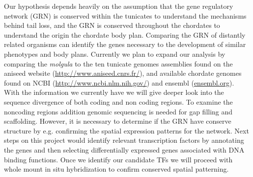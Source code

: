 Our hypothesis depends heavily on the assumption that the gene regulatory network (GRN) is conserved within the tunicates to understand the mechanisms behind tail loss, and the GRN is conserved throughout the chordates to understand the origin the chordate body plan. Comparing the GRN of distantly related organisms can identify the genes necessary to the development of similar phenotypes and body plans. Currently we plan to expand our analysis by comparing the \textit{molgula} to the ten tunicate genomes assemblies found on the aniseed website (\url{http://www.aniseed.cnrs.fr/}), and available chordate genomes found on NCBI (\url{http://www.ncbi.nlm.nih.gov/}) and ensembl (\url{ensembl.org}). With the information we currently have we will give deeper look into the sequence divergence of both coding and non coding regions. To examine the noncoding regions addition genomic sequencing is needed for gap filling and scaffolding. However, it is necessary to determine if the GRN have conserve structure by e.g. confirming the spatial expression patterns for the network. Next steps on this project would identify relevant transcription factors by annotating the genes and then selecting differentially expressed genes associated with DNA binding functions. Once we identify our candidate TFs we will proceed with whole mount in situ hybridization to confirm conserved spatial patterning.

